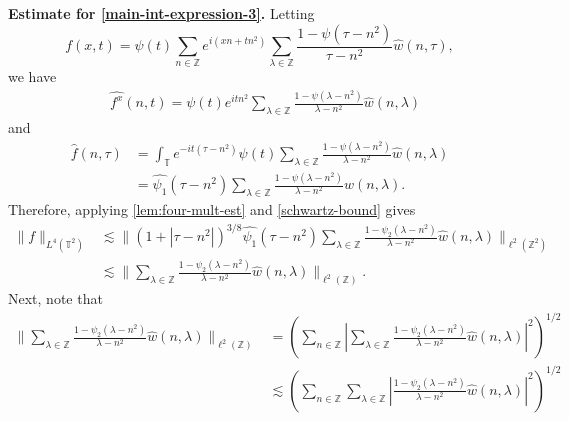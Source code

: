 \documentclass[12pt,reqno]{amsart}
\newcommand{\wh}{\widehat}
\newcommand{\zz}{\mathbb{Z}}
\newcommand{\ci}{\mathbb{T}}
\theoremstyle{plain}  %
\begin{document}
\vskip0.1in
{\bf Estimate for \eqref{main-int-expression-3}.} 
Letting $$f(x,t) = \psi(t) \sum_{n \in \zz} e^{i\left( xn + tn^2 \right)} 
\sum_{\lambda \in \zz} \frac{1 - \psi\left( \tau - n^2 \right)}{\tau - n^2} 
\wh{w} \left( n, \tau \right),$$ we have
%
%
\begin{equation*}
	\begin{split}
		& \wh{f^x}(n, t) = \psi(t) e^{itn^2} \sum_{\lambda \in \zz} 
		\frac{1 - \psi\left( \lambda - n^2 \right)}{\lambda - n^2} 
		\wh{w}(n, \lambda)
	\end{split}
\end{equation*}
and
\begin{equation*}
	\begin{split}
		 \wh{f}\left( n, \tau \right)
		 & = \int_\ci e^{-it\left( \tau - n^2 
		\right)} \psi(t) \sum_{\lambda \in \zz} \frac{1 - \psi\left( 
		\lambda - n^2 
		\right)}{\lambda - n^2} \wh{w}(n, \lambda)
		\\
		& = \wh{\psi_1}\left( \tau - n^2 \right) \sum_{\lambda \in \zz}
		\frac{1 - \psi\left( 
		\lambda - n^2 
		\right)}{\lambda - n^2} \wh{w}(n, \lambda).
	\end{split}
\end{equation*}
%
%
Therefore, applying \autoref{lem:four-mult-est} and 
\eqref{schwartz-bound} gives 
%
%
\begin{equation}
	\label{4hh}
	\begin{split}
		\|f\|_{L^4(\ci^2)}
		& \lesssim \|\left( 1 + | \tau - n^2| \right)^{3/8} 
		\wh{\psi_1}\left( \tau - n^2 \right) \sum_{\lambda \in \zz} 
		\frac{1 - \psi_2\left( \lambda - n^2 \right)}{\lambda - n^2} 
		\wh{w}\left( n, \lambda \right) 
		\|_{\ell^2\left( \zz^2 \right)}
		\\
		& \lesssim \|\sum_{\lambda \in \zz}
		\frac{1 - \psi_2\left( \lambda - n^2 \right)}{\lambda - n^2} \wh{w} 
		\left( n, \lambda \right) \|_{\ell^2\left( \zz \right)}.
	\end{split}
\end{equation}
%
%
Next, note 
that 
%
%
\begin{equation}
	\label{apply-ortho}
	\begin{split}
		\|\sum_{\lambda \in \zz}
		\frac{1 - \psi_2\left( \lambda - n^2 \right)}{\lambda - n^2} \wh{w} 
		\left( n, \lambda \right) \|_{\ell^2\left( \zz \right)}
		& = \left( \sum_{n \in \zz}  | \sum_{\lambda \in \zz}
		\frac{1 - \psi_2\left( \lambda - n^2 \right)}{\lambda - n^2} \wh{w} 
		\left( n, \lambda \right) |^2 \right )^{1/2}
		\\
		& \lesssim \left( \sum_{n \in \zz} \sum_{\lambda \in \zz} |
		\frac{1 - \psi_2\left( \lambda - n^2 \right)}{\lambda - n^2} 
		\wh{w}\left( n, \lambda \right) |^2 
		\right)^{1/2} 
	\end{split}
\end{equation}
\end{document}

